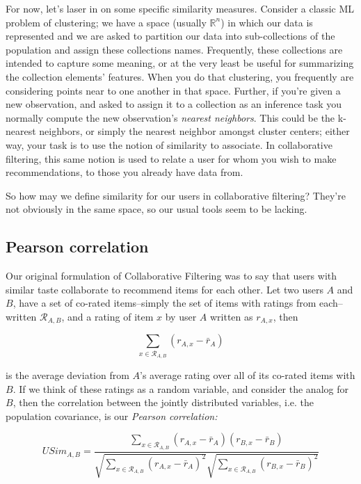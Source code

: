 For now, let's laser in on some specific similarity measures. Consider a classic ML problem of clustering; we have a space (usually $\mathbb{R}^n$) in which our data is represented and we are asked to partition our data into sub-collections of the population and assign these collections names. Frequently, these collections are intended to capture some meaning, or at the very least be useful for summarizing the collection elements' features. When you do that clustering, you frequently are considering points near to one another in that space. Further, if you're given a new observation, and asked to assign it to a collection as an inference task you normally compute the new observation's \emph{nearest neighbors}. This could be the k-nearest neighbors, or simply the nearest neighbor amongst cluster centers; either way, your task is to use the notion of similarity to associate. In collaborative filtering, this same notion is used to relate a user for whom you wish to make recommendations, to those you already have data from. 

So how may we define similarity for our users in collaborative filtering? They're not obviously in the same space, so our usual tools seem to be lacking. 

\subsection{Pearson correlation}

Our original formulation of Collaborative Filtering was to say that users with similar taste collaborate to recommend items for each other. Let two users $A$ and $B$, have a set of co-rated items–simply the set of items with ratings from each–written $\mathcal{R}_{A,B}$, and a rating of item $x$ by user $A$ written as $r_{A,x}$, then 

\begin{equation}
    \sum_{x\in \mathcal{R}_{A,B}}(r_{A,x}-\bar{r}_A)
\end{equation}

is the average deviation from $A$'s average rating over all of its co-rated items with $B$. If we think of these ratings as a random variable, and consider the analog for $B$, then the correlation between the jointly distributed variables, i.e. the population covariance, is our \emph{Pearson correlation:}

\begin{equation}
USim_{A,B}=\frac{\sum_{x\in \mathcal{R}_{A,B}}(r_{A,x}-\bar{r}_A)(r_{B,x}-\bar{r}_B)}{\sqrt{\sum_{x\in \mathcal{R}_{A,B}}(r_{A,x}-\bar{r}_A)^2} \sqrt{\sum_{x\in \mathcal{R}_{A,B}}(r_{B,x}-\bar{r}_B)^2}}    
\end{equation}

